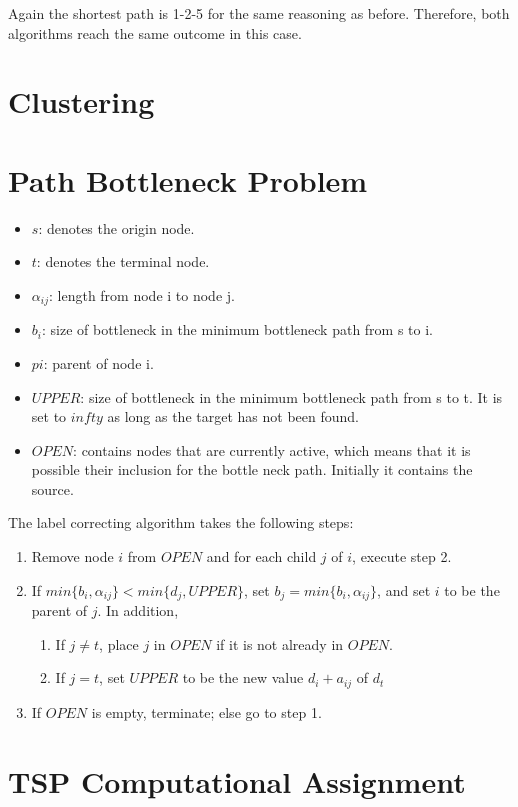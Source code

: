 \documentclass[11pt, oneside]{article}   	%
\begin{document}
Again the shortest path is 1-2-5 for the same reasoning as before. Therefore, both algorithms reach the same outcome in this case.


\section{Clustering}


\section{Path Bottleneck Problem}

\begin{itemize}
	\item $s$: denotes the origin node.
	\item $t$: denotes the terminal node.
	\item $\alpha_{ij}$: length from node i to node j.
	\item $b_{i}$: size of bottleneck in the minimum bottleneck path from s to i.
	\item $p{i}$: parent of node i.
	\item $UPPER$: size of bottleneck in the minimum bottleneck path from s to t. It is set to $infty$ as long as the target has not been found.
	\item $OPEN$: contains nodes that are currently active, which means that it is possible their inclusion for the bottle neck path. Initially it contains the source.
\end{itemize}
The label correcting algorithm takes the following steps:
\begin{enumerate}
	\item Remove node $i$ from $OPEN$ and for each child $j$ of $i$, execute step 2.
	\item If $min\{b_{i},\alpha_{ij}\} < min\{d_{j},UPPER\}$, set $b_{j}=min\{b_{i},\alpha_{ij}\}$, and set $i$ to be the parent of $j$. In addition,
	\begin{enumerate}
		\item If $j \neq t$, place $j$ in $OPEN$ if it is not already in $OPEN$.
		\item If $j = t$, set $UPPER$ to be the new value $d_{i}+a_{ij}$ of $d_{t}$
	\end{enumerate}
	\item If $OPEN$ is empty, terminate; else go to step 1.
\end{enumerate}
\section{TSP Computational Assignment}
\end{document}
